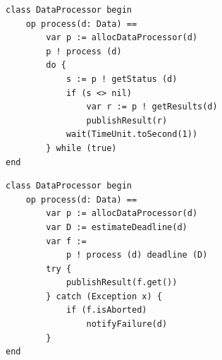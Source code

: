 \begin{center}
\begin{minipage}[t]{0.48\textwidth}
\begin{lstlisting}[label=lst:frh:polling, caption=With polling]
class DataProcessor begin
	op process(d: Data) ==
		var p := allocDataProcessor(d)
		p ! process (d)
		do {
			s := p ! getStatus (d)
			if (s <> nil)
				var r := p ! getResults(d)
				publishResult(r)
			wait(TimeUnit.toSecond(1))
		} while (true)
end
\end{lstlisting}
\end{minipage}
\hfill
\begin{minipage}[t]{0.48\textwidth}
\begin{lstlisting}[label=lst:frh:deadlines, caption=With deadlines]
class DataProcessor begin
	op process(d: Data) == 
		var p := allocDataProcessor(d)
		var D := estimateDeadline(d)
		var f := 
			p ! process (d) deadline (D)
		try {
			publishResult(f.get())
		} catch (Exception x) {
			if (f.isAborted)
				notifyFailure(d)
		}
end 
\end{lstlisting}
\end{minipage}
\end{center}



